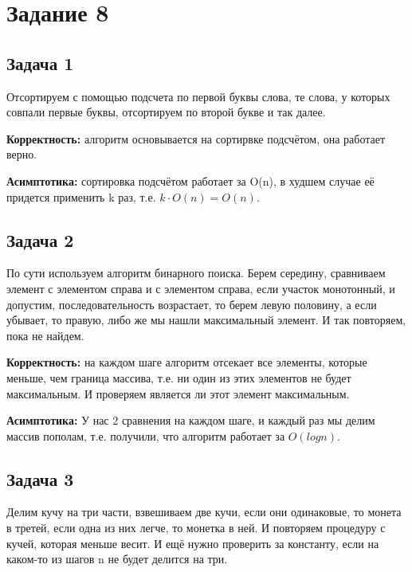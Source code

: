 \documentclass[a4paper,14pt]{article} %
\begin{document}

\section{Задание 8}
\subsection{Задача 1}
Отсортируем с помощью подсчета по первой буквы слова, те слова, у которых совпали первые буквы, отсортируем по второй букве и так далее.

\textbf{Корректность: } алгоритм основывается на сортирвке подсчётом, она работает верно.

\textbf{Асимптотика: } сортировка подсчётом работает за O(n), в худшем случае её придется применить k раз, т.е. $k \cdot O(n) = O(n)$.

\subsection{Задача 2}
По сути используем алгоритм бинарного поиска. Берем середину, сравниваем элемент с элементом справа и с элементом справа, если участок монотонный, и допустим, последовательность возрастает, то берем левую половину, а если убывает, то правую, либо же мы нашли максимальный элемент.
И так повторяем, пока не найдем.

\textbf{Корректность: } на каждом шаге алгоритм отсекает все элементы, которые меньше, чем граница массива, т.е. ни один из этих элементов не будет максимальным. И проверяем является ли этот элемент максимальным.

\textbf{Асимптотика: } У нас 2 сравнения на каждом шаге, и каждый раз мы делим массив пополам, т.е. получили, что алгоритм работает за $O(logn)$.

\subsection{Задача 3}
Делим кучу на три части, взвешиваем две кучи, если они одинаковые, то монета в третей, если одна из них легче, то монетка в ней. 
И повторяем процедуру с кучей, которая меньше весит. И ещё нужно проверить за константу, если на каком-то из шагов n не будет делится на три.
\end{document}
